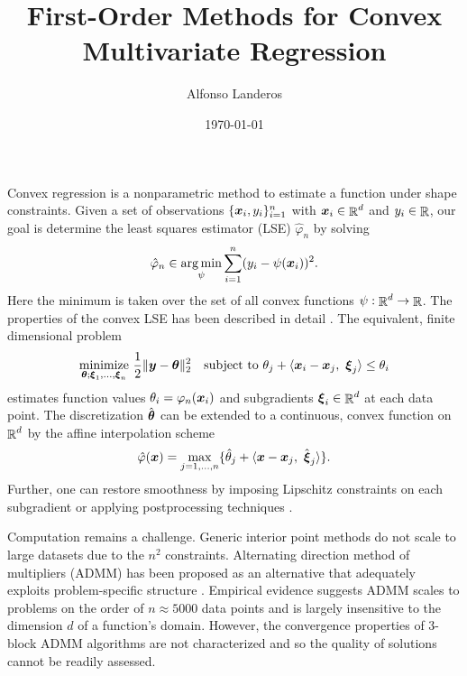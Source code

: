 \documentclass{article}
\title{First-Order Methods for Convex Multivariate Regression}
\author{Alfonso Landeros}
\date{\today}
\begin{document}
\maketitle

Convex regression is a nonparametric method to estimate a function under shape constraints.
Given a set of observations \(\{\boldsymbol{x}_{i}, y_{i}\}_{i=1}^{n}\) with \(\boldsymbol{x}_{i} \in \mathop{\mathbb{R}}\nolimits^{d}\) and \(y_{i} \in \mathop{\mathbb{R}}\nolimits\), our goal is determine the least squares estimator (LSE) \(\hat{\varphi}_{n}\) by solving
\begin{equation*}
    \hat{\varphi}_{n} \in \underset{\psi}{\arg \min}
    \sum_{i=1}^{n} (y_{i} - \psi(\boldsymbol{x}_{i}))^{2}.
\end{equation*}
Here the minimum is taken over the set of all convex functions \(\psi : \mathop{\mathbb{R}}\nolimits^{d} \rightarrow \mathop{\mathbb{R}}\nolimits\).
The properties of the convex LSE has been described in detail \cite{seijo2011}.
The equivalent, finite dimensional problem
\begin{equation*}
    \underset{\boldsymbol{\theta}; \boldsymbol{\xi}_{1}, \ldots, \boldsymbol{\xi}_{n}}{\mathrm{minimize}}
    ~\frac{1}{2} \|\boldsymbol{y} - \boldsymbol{\theta}\|_{2}^{2}
    \quad
    \text{subject to}
    ~\theta_{j} + \langle{\boldsymbol{x}_{i} - \boldsymbol{x}_{j},~\boldsymbol{\xi}_{j}}\rangle \le \theta_{i}
\end{equation*}
estimates function values \(\theta_{i} = \varphi_{n}(\boldsymbol{x}_{i})\) and subgradients \(\boldsymbol{\xi}_{i} \in \mathop{\mathbb{R}}\nolimits^{d}\) at each data point.
The discretization \(\hat{\boldsymbol{\theta}}\) can be extended to a continuous, convex function on \(\mathop{\mathbb{R}}\nolimits^{d}\) by the affine interpolation scheme
\begin{equation*}
    \hat{\varphi}(\boldsymbol{x})
    =
    \max_{j=1,\ldots,n}\{\hat{\theta}_{j}
    + \langle{\boldsymbol{x}- \boldsymbol{x}_{j},~\hat{\boldsymbol{\xi}}_{j}}\rangle\}.
\end{equation*}
Further, one can restore smoothness by imposing Lipschitz constraints on each subgradient or applying postprocessing techniques \cite{mazumder2018}.

Computation remains a challenge.
Generic interior point methods do not scale to large datasets due to the \(n^{2}\) constraints.
Alternating direction method of multipliers (ADMM) has been proposed as an alternative that adequately exploits problem-specific structure \cite{mazumder2018}.
Empirical evidence suggests ADMM scales to problems on the order of \(n \approx 5000\) data points and is largely insensitive to the dimension \(d\) of a function's domain.
However, the convergence properties of 3-block ADMM algorithms are not characterized and so the quality of solutions cannot be readily assessed.
\end{document}
